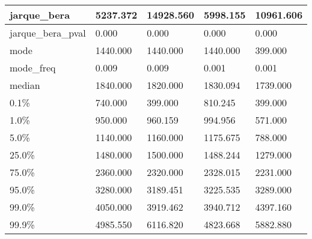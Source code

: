\begin{table}[H]
\begin{tabular}{|l|m{10em}|m{10em}|m{10em}|m{10em}|}
\hline jarque\_bera & 5237.372 & 14928.560 & 5998.155 & 10961.606 \\
\hline jarque\_bera\_pval & 0.000 & 0.000 & 0.000 & 0.000 \\
\hline mode & 1440.000 & 1440.000 & 1440.000 & 399.000 \\
\hline mode\_freq & 0.009 & 0.009 & 0.001 & 0.001 \\
\hline median & 1840.000 & 1820.000 & 1830.094 & 1739.000 \\
\hline 0.1\% & 740.000 & 399.000 & 810.245 & 399.000 \\
\hline 1.0\% & 950.000 & 960.159 & 994.956 & 571.000 \\
\hline 5.0\% & 1140.000 & 1160.000 & 1175.675 & 788.000 \\
\hline 25.0\% & 1480.000 & 1500.000 & 1488.244 & 1279.000 \\
\hline 75.0\% & 2360.000 & 2320.000 & 2328.015 & 2231.000 \\
\hline 95.0\% & 3280.000 & 3189.451 & 3225.535 & 3289.000 \\
\hline 99.0\% & 4050.000 & 3919.462 & 3940.712 & 4397.160 \\
\hline 99.9\% & 4985.550 & 6116.820 & 4823.668 & 5882.880 \\
\hline
\end{tabular}
\end{table}
